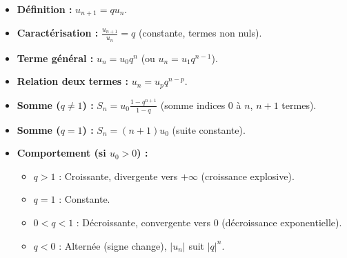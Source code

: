 \documentclass[11pt]{article}
\begin{document}
\begin{aretenir}
\begin{itemize}
    \item \textbf{Définition :} $u_{n+1} = q u_n$.
    \item \textbf{Caractérisation :} $\frac{u_{n+1}}{u_n} = q$ (constante, termes non nuls).
    \item \textbf{Terme général :} $u_n = u_0 q^n$ \quad (ou $u_n = u_1 q^{n-1}$).
    \item \textbf{Relation deux termes :} $u_n = u_p q^{n-p}$.
    \item \textbf{Somme ($q \neq 1$) :} $S_n = u_0 \frac{1-q^{n+1}}{1-q}$ (somme indices $0$ à $n$, $n+1$ termes).
    \item \textbf{Somme ($q = 1$) :} $S_n = (n+1)u_0$ (suite constante).
    \item \textbf{Comportement (si $u_0 > 0$) :}
    \begin{itemize}
        \item $q > 1$ : Croissante, divergente vers $+\infty$ (croissance explosive).
        \item $q = 1$ : Constante.
        \item $0 < q < 1$ : Décroissante, convergente vers $0$ (décroissance exponentielle).
        \item $q < 0$ : Alternée (signe change), $|u_n|$ suit $|q|^n$.
    \end{itemize}
\end{itemize}
\end{aretenir}
\end{document}
